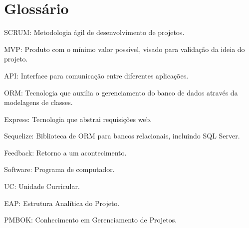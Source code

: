 \section{Glossário}
SCRUM:		Metodologia ágil de desenvolvimento de projetos.

MVP:		Produto com o mínimo valor possível, visado para validação da ideia do projeto.

API:		Interface para comunicação entre diferentes aplicações.

ORM:		Tecnologia que auxilia o gerenciamento do banco de dados através da modelagens de classes.

Express:	Tecnologia que abstrai requisições web.

Sequelize:	Biblioteca de ORM para bancos relacionais, incluindo SQL Server.

Feedback:	Retorno a um acontecimento.

Software:	Programa de computador.

UC:			Unidade Curricular.

EAP:		Estrutura Analítica do Projeto.

PMBOK:      Conhecimento em Gerenciamento de Projetos.

